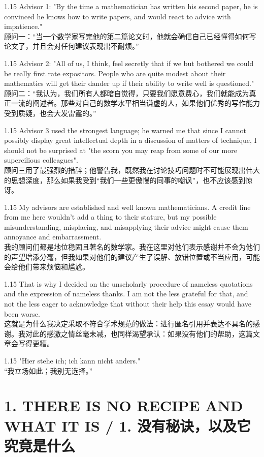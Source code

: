 \documentclass[12pt,a4paper]{article}
\newcommand{\bilingual}[2]{
    \begin{spacing}{1.15} %
        \noindent \normalsize #1 \\[-0.5ex] %
        \small \textcolor{blue!70!black}{#2} %
    \end{spacing}
    \vspace{0.8em} %
}
\begin{document}
\bilingual{Advisor 1: "By the time a mathematician has written his second paper, he is convinced he knows how to write papers, and would react to advice with impatience."}
{顾问一：“当一个数学家写完他的第二篇论文时，他就会确信自己已经懂得如何写论文了，并且会对任何建议表现出不耐烦。”} %

\bilingual{Advisor 2: "All of us, I think, feel secretly that if we but bothered we could be really first rate expositors. People who are quite modest about their mathematics will get their dander up if their ability to write well is questioned."}
{顾问二：“我认为，我们所有人都暗自觉得，只要我们愿意费心，我们就能成为真正一流的阐述者。那些对自己的数学水平相当谦虚的人，如果他们优秀的写作能力受到质疑，也会大发雷霆的。”} %

\bilingual{Advisor 3 used the strongest language; he warned me that since I cannot possibly display great intellectual depth in a discussion of matters of technique, I should not be surprised at "the scorn you may reap from some of our more supercilious colleagues".}
{顾问三用了最强烈的措辞；他警告我，既然我在讨论技巧问题时不可能展现出伟大的思想深度，那么如果我受到“我们一些更傲慢的同事的嘲讽”，也不应该感到惊讶。} %

\bilingual{My advisors are established and well known mathematicians. A credit line from me here wouldn't add a thing to their stature, but my possible misunderstanding, misplacing, and misapplying their advice might cause them annoyance and embarrassment.}
{我的顾问们都是地位稳固且著名的数学家。我在这里对他们表示感谢并不会为他们的声望增添分毫，但我如果对他们的建议产生了误解、放错位置或不当应用，可能会给他们带来烦恼和尴尬。} %

\bilingual{That is why I decided on the unscholarly procedure of nameless quotations and the expression of nameless thanks. I am not the less grateful for that, and not the less eager to acknowledge that without their help this essay would have been worse.}
{这就是为什么我决定采取不符合学术规范的做法：进行匿名引用并表达不具名的感谢。我对此的感激之情丝毫未减，也同样渴望承认：如果没有他们的帮助，这篇文章会写得更糟。} %

\bilingual{"Hier stehe ich; ich kann nicht anders."}
{“我立场如此；我别无选择。”} %
\section*{1. THERE IS NO RECIPE AND WHAT IT IS / 1. 没有秘诀，以及它究竟是什么} %
\end{document}
